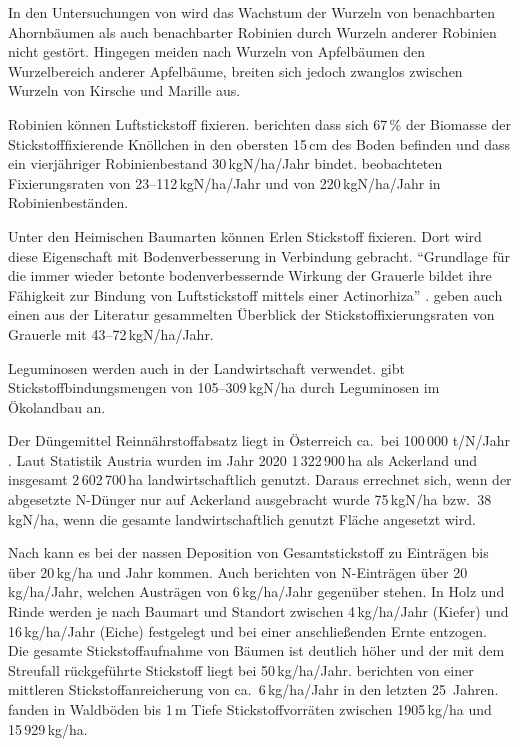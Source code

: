 \documentclass[twocolumn]{scrartcl}
\begin{document}
In den Untersuchungen von
\citet[S.~150--160]{scamoni1952robinieWurzeln} wird das Wachstum der
Wurzeln von benachbarten Ahornbäumen als auch benachbarter Robinien
durch Wurzeln anderer Robinien nicht gestört. Hingegen meiden nach
\citet[S.~53]{kolesnikov1971wurzeln} Wurzeln von Apfelbäumen den
Wurzelbereich anderer Apfelbäume, breiten sich jedoch zwanglos
zwischen Wurzeln von Kirsche und Marille aus.

Robinien können Luftstickstoff fixieren.
\citet{boring1984robinieN} berichten dass sich 67\,\% der Biomasse der
Stickstofffixierende Knöllchen in den obersten 15\,cm des Boden befinden
und dass ein vierjähriger Robinienbestand 30\,kgN/ha/Jahr bindet.
\citet{noh2009robinieN} beobachteten
Fixierungsraten von 23--112\,kgN/ha/Jahr und \citet{danso1995robinieN}
von 220\,kgN/ha/Jahr in Robinienbeständen.

Unter den Heimischen Baumarten können Erlen Stickstoff fixieren. Dort
wird diese Eigenschaft mit Bodenverbesserung in Verbindung
gebracht. \enquote{Grundlage für die immer wieder betonte bodenverbessernde
Wirkung der Grauerle bildet ihre Fähigkeit zur Bindung von
Luftstickstoff mittels einer Actinorhiza}
\citep{schuett2014alnusIncarna}. \citet{schuett2014alnusIncarna} geben
auch einen aus der Literatur gesammelten Überblick der
Stickstoffixierungsraten von Grauerle mit 43--72\,kgN/ha/Jahr.

Leguminosen werden auch in der Landwirtschaft verwendet.
\citet{kolbe2008stickstoff} gibt Stickstoffbindungsmengen von
105--309\,kgN/ha durch Leguminosen im Ökolandbau an.

Der Düngemittel Reinnährstoffabsatz liegt in Österreich ca.\ bei 100\,000
t/N/Jahr \citep{ama2024duengemittel}. Laut Statistik Austria wurden im Jahr 2020
1\,322\,900\,ha als Ackerland und insgesamt 2\,602\,700\,ha landwirtschaftlich
genutzt. Daraus errechnet sich, wenn der abgesetzte N-Dünger nur auf Ackerland
ausgebracht wurde 75\,kgN/ha bzw.\ 38\,kgN/ha, wenn die gesamte
landwirtschaftlich genutzt Fläche angesetzt wird.

Nach \citet{uba1998deposition} kann es bei der nassen Deposition von
Gesamtstickstoff zu Einträgen bis über 20\,kg/ha und Jahr kommen. Auch
\citet{raspe2018stickstoff} berichten von N-Einträgen über
20\,kg/ha/Jahr, welchen Austrägen von 6\,kg/ha/Jahr gegenüber
stehen. In Holz und Rinde werden je nach Baumart und Standort zwischen
4\,kg/ha/Jahr (Kiefer) und 16\,kg/ha/Jahr (Eiche) festgelegt und bei
einer anschließenden Ernte entzogen. Die gesamte Stickstoffaufnahme
von Bäumen ist deutlich höher und der mit dem Streufall rückgeführte
Stickstoff liegt bei 50\,kg/ha/Jahr. \citet{raspe2018stickstoff}
berichten von einer mittleren Stickstoffanreicherung von
ca.\ 6\,kg/ha/Jahr in den letzten 25~Jahren.
\citet{emberger1965stickstoff} fanden in Waldböden bis 1\,m Tiefe
Stickstoffvorräten zwischen 1905\,kg/ha und 15\,929\,kg/ha.
\end{document}
